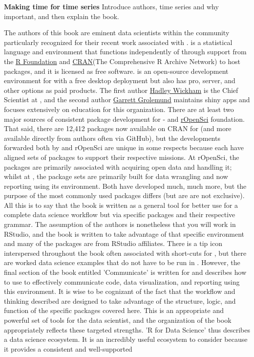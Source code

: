 \documentclass[bookreview]{jss}
\begin{document}
\textbf{Making time for time series} \newline
Introduce authors, time series and why important, and then explain the book.

The authors of this book are eminent data scientists within the  community particularly recognized for their recent work associated with .  is a statistical language and environment that functions independently of  through support from the \href{https://www.r-project.org/about.html}{R Foundation} and \href{https://cran.r-project.org/mirrors.html}{CRAN}(The Comprehensive R Archive Network) to host packages, and it is licensed as free software.  is an open-source development environment for  with a free desktop deployment but also has pro, server, and other options as paid products. The first author \href{https://en.wikipedia.org/wiki/Hadley_Wickham}{Hadley Wickham} is the Chief Scientist at , and the second author \href{http://www.oreilly.com/pub/au/5570}{Garrett Grolemund} maintains shiny apps and focuses extensively on education for this organization.  There are at least two major sources of consistent package development for  -  and \href{https://ropensci.org/packages/}{rOpenSci} foundation. That said, there are 12,412 packages now available on CRAN for  (and more available directly from authors often via GitHub), but the developments forwarded both by  and rOpenSci are unique in some respects because each have aligned sets of packages to support their respective missions. At rOpenSci, the packages are primarily associated with acquiring open data and handling it; whilst at , the package sets are primarily built for data wrangling and now reporting using its environment. Both have developed much, much more, but the purpose of the most commonly used packages differs (but are are not exclusive). All this is to say that the book is written as a general tool for better  use for a complete data science workflow but via specific packages and their respective grammar. The assumption of the authors is nonetheless that you will work in RStudio, and the book is written to take advantage of that specific environment and many of the packages are from RStudio affiliates. There is a tip icon interspersed throughout the book often associated with short-cuts for , but there are worked data science examples that do not have to be run in . However, the final section of the book entitled 'Communicate' is written for  and describes how to use  to effectively communicate code, data visualization, and reporting using this environment. It is wise to be cognizant of the fact that the workflow and thinking described are designed to take advantage of the structure, logic, and function of the specific packages covered here. This is an appropriate and powerful set of tools for the data scientist, and the organization of the book appropriately reflects these targeted strengths. 'R for Data Science' thus describes a data science ecosystem. It is an incredibly useful ecosystem to consider because it provides a consistent and well-supported 
\end{document}
